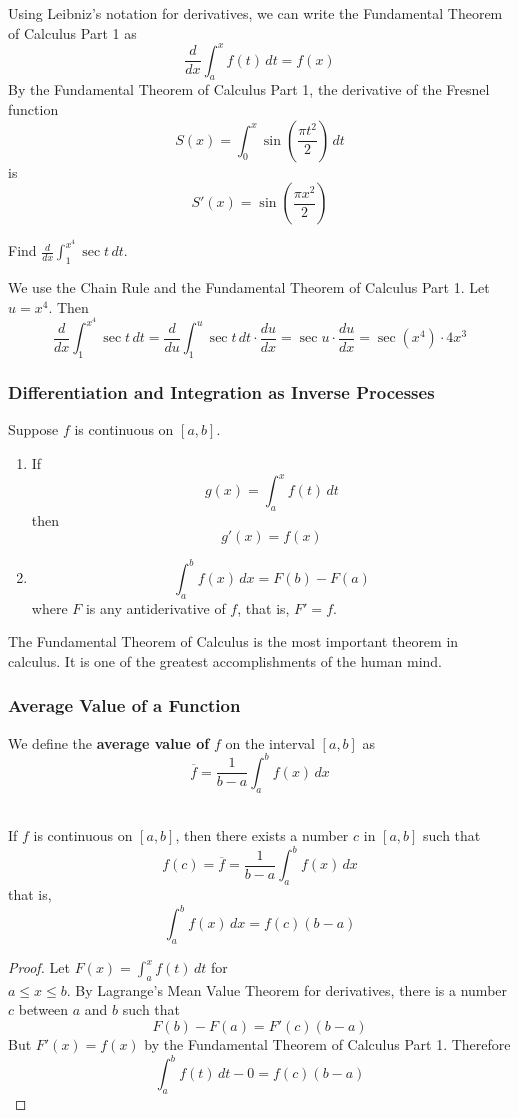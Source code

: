 Using Leibniz's notation for derivatives, we can write the Fundamental Theorem
of Calculus Part 1 as
\[\frac{d}{dx}\int_a^x f(t)\,dt=f(x)\]
By the Fundamental Theorem of Calculus Part 1, the derivative of the Fresnel
function
\[S(x)=\int_0^x \sin\left(\frac{\pi t^2}{2}\right)\,dt\]
is
\[S'(x)=\sin\left(\frac{\pi x^2}{2}\right)\]
\begin{problem}
    Find \(\displaystyle{\frac{d}{dx}\int_1^{x^4}\sec t\,dt}\).
\end{problem}
\begin{solution}
    We use the Chain Rule and the Fundamental Theorem of Calculus Part 1.
    Let \(u=x^4\).
    Then
    \[\frac{d}{dx}\int_1^{x^4}\sec t\,dt
    =\frac{d}{du}\int_1^u\sec t\,dt\cdot\frac{du}{dx}
    =\sec u\cdot\frac{du}{dx}=\sec (x^4)\cdot 4x^3\]
\end{solution}

\subsubsection*{Differentiation and Integration as Inverse Processes}
\begin{theorem}
    Suppose \(f\) is continuous on \([a,b]\).
    \begin{enumerate}
        \item If
        \[g(x)=\int_a^x f(t)\,dt\]
        then
        \[g'(x)=f(x)\]
        \item
        \[\int_a^b f(x)\,dx=F(b)-F(a)\]
        where \(F\) is any antiderivative of \(f\), that is, \(F'=f\).
    \end{enumerate}
\end{theorem}
The Fundamental Theorem of Calculus is the most important theorem in calculus.
It is one of the greatest accomplishments of the human mind.

\subsubsection*{Average Value of a Function}
We define the \textbf{average value of} \(f\) on the interval \([a,b]\) as
\[\overline{f}=\frac{1}{b-a}\int_a^b f(x)\,dx\]\
\begin{theorem}
    If \(f\) is continuous on \([a,b]\), then there exists a number \(c\) in
    \([a,b]\) such that
    \[f(c)=\overline{f}=\frac{1}{b-a}\int_a^b f(x)\,dx\]
    that is,
    \[\int_a^b f(x)\,dx=f(c)(b-a)\]
\end{theorem}
\begin{proof}
    Let \(\displaystyle{F(x)=\int_a^x f(t)\,dt}\) for \\
    \(a\leq x\leq b\).
    By Lagrange's Mean Value Theorem for derivatives, there is a number \(c\)
    between \(a\) and \(b\) such that
    \[F(b)-F(a)=F'(c)(b-a)\]
    But \(F'(x)=f(x)\) by the Fundamental Theorem of Calculus Part 1.
    Therefore
    \[\int_a^b f(t)\,dt-0=f(c)(b-a)\]
\end{proof}